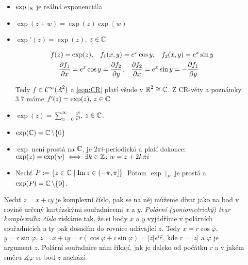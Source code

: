 \begin{properties}
\mbox{}
\vspace{-2em}
\begin{itemize}    
    \item $\exp \mid_{\operatorname{\mathbb{R}}} $ je reálná exponenciála 
    \item $\exp(z+w)=\exp(z)\exp(w)$
    \item $\exp'(z)=\exp(z)$, $ z \in\operatorname{\mathbb{C}}  $
 
 \begin{equation*}
 \begin{aligned}
    f(z) = \exp(z), \hspace{3mm}
    f_1(x,y) &=e^x \cos y, \hspace{3mm}
    f_2(x,y) =e^x\sin y\\
    \frac{\partial f_1}{\partial x} = e^x\cos y = \frac{\partial f_2}{\partial y}&, \hspace{3mm}
     \frac{\partial f_2}{\partial x} = e^x \sin y= - \frac{\partial f_1}{\partial y}
\end{aligned}
\end{equation*}
   
     
     
     
    Tedy $f\in\mathcal{C}^{\infty}(\operatorname{\mathbb{R}} ^2)$ %
    a \cref{eqn:CR} platí všude v $\operatorname{\mathbb{R}} ^2\cong\operatorname{\mathbb{C}}  $. Z CR-věty a poznámky 3.7 máme $f'(z)=\exp(z)\text{, } z\in\operatorname{\mathbb{C}}  $
    \item $\exp(z)=\sum_{n=0}^{\infty}\frac{z^n}{n!}$, $z\in\operatorname{\mathbb{C}}  \text{.}$
    \item $\exp(\operatorname{\mathbb{C}}  )=\operatorname{\mathbb{C}}  \setminus\{0\}$ 
    \item $\exp$ není prostá na $\operatorname{\mathbb{C}}  $, je $2\pi i$-periodická a platí dokonce:
    \newline
    $\exp(z) =\exp(w) \iff\exists k \in\operatorname{\mathbb{Z}} \colon w=z+2k\pi i$
     \item Nechť $P:=\{z\in\operatorname{\mathbb{C}}  \mid \operatorname{Im} z \in \left (-\pi,\pi\right ]\}$.
     Potom $\exp\mid_P$ je prostá a $\exp(P)=\operatorname{\mathbb{C}}  \setminus\{0\}$.
    \newline
  \end{itemize}  
  \end{properties}
  \begin{note}
    Nechť $z=x+iy$ je komplexní číslo, pak se na něj můžeme dívat jako na bod v rovině určený kartézskými souřadnicemi $x$ a $y$. \emph{Polární (goniometrický) tvar komplexního čísla} získáme tak, že si body $x$ a $y$ vyjádříme v polárních souřadnicích a ty pak dosadím do rovnice udávající $z$. Tedy
       $x=r\cos \varphi$, 
       $y=r\sin \varphi$, 
       $z=x+iy=r(\cos \varphi + i \sin \varphi)=\lvert z \rvert e^{i\varphi} $, kde $r=\lvert z \rvert$ a $\varphi$ je argument $z$.
       Polární souřadnice nám říkají, jak je daleko od počátku $r$ a v jakém směru  $\measuredangle \varphi$ se bod $z$ nachází.
 \end{note}
     
